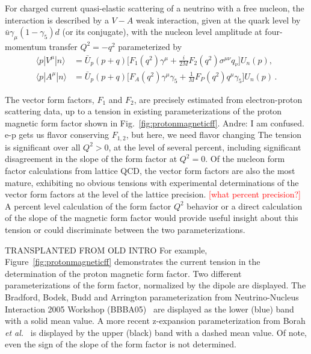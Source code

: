 For charged current quasi-elastic scattering of a neutrino with a free nucleon,
the interaction is described by a $V-A$ weak interaction, given at the quark level by
$\bar{u}\gamma_\mu(1- \gamma_5)d$ (or its conjugate), with the nucleon level amplitude at four-momentum transfer $Q^2 = -q^2$ parameterized by
\begin{align}
 \langle p | V^\mu | n \rangle
 &= \bar{U}_p(p+q) \Big[
 F_1(q^2) \gamma^\mu +\frac{i}{2M} F_2(q^2) \sigma^{\mu\nu} q_\nu
 \Big] U_n(p),
 \nonumber\\
 \langle p | A^\mu | n \rangle
 &= \bar{U}_p(p+q) \Big[
 F_A(q^2) \gamma^\mu \gamma_5 +\frac{1}{M} F_P(q^2) q^\mu \gamma_5
 \Big] U_n(p)\, .
\end{align}

The vector form factors, $F_1$ and $F_2$,
are precisely estimated from electron-proton scattering data,
up to a tension in existing parameterizations of the proton magnetic form factor
shown in Fig.~\ref{fig:protonmagneticff}.
{\color{red}Andre: I am confused.  e-p gets us flavor conserving $F_{1,2}$, but here, we need flavor changing}
The tension is significant over all $Q^2 > 0$, at the level of several percent,
including significant disagreement in the slope of the form factor at $Q^2 = 0$.
Of the nucleon form factor calculations from lattice QCD,
the vector form factors are also the most mature,
exhibiting no obvious tensions with experimental determinations
of the vector form factors at the level of the lattice precision.
\textcolor{red}{[what percent precision?]}
A percent level calculation of the form factor $Q^2$ behavior
or a direct calculation of the slope of the magnetic form factor
would provide useful insight about this tension or could discriminate
between the two parameterizations.





{\color{red}TRANSPLANTED FROM OLD INTRO}
For example, Figure~\ref{fig:protonmagneticff} demonstrates the current tension in the determination of the proton magnetic form factor.
Two different parameterizations of the form factor, normalized by the dipole are displayed.
The Bradford, Bodek, Budd and Arrington parameterization from Neutrino-Nucleus Interaction 2005 Workshop (BBBA05)~\cite{Bradford:2006yz} are displayed as the lower (blue) band with a solid mean value.
A more recent z-expansion parameterization from Borah {\it et al.}~\cite{Borah:2020gte} is displayed by the upper (black) band with a dashed mean value.
Of note, even the sign of the slope of the form factor is not determined.



